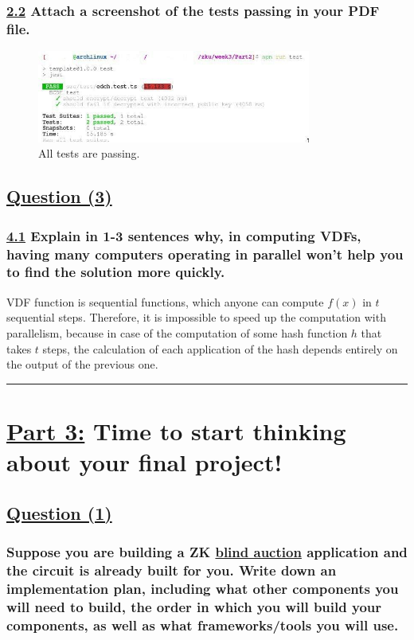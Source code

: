 \documentclass[letterpaper, 10 pt, conference]{ieeeconf}  %
\begin{document}
\subsubsection{\textbf{\underline{2.2} Attach a screenshot of the tests passing in your PDF file.}}

\begin{figure}[htp]
    \centering
    \includegraphics[width=9cm]{assets/photo_2022-07-25_23-23-16}
    \caption{All tests are passing.}
    \label{fig:galaxy}
\end{figure}

\subsection{\textbf{\underline{Question (3)}}}
\subsubsection{\textbf{\underline{4.1} Explain in 1-3 sentences why, in computing VDFs, having many computers operating in parallel won't help you to find the solution more quickly.}}

VDF function is sequential functions, which anyone can compute $f(x)$ in $t$ sequential steps. Therefore, it is impossible to speed up the computation with parallelism, because in case of the computation of some hash function $h$ that takes $t$ steps, the calculation of each application of the hash depends entirely on the output of the previous one. \cite{c2}

\noindent\rule{8cm}{0.4pt}

\section{\textbf{\underline{Part 3:}} Time to start thinking about your final project!}

\subsection{\textbf{}\underline{Question (1)}}
\subsubsection{\textbf{Suppose you are building a ZK \href{https://en.wikipedia.org/wiki/First-price_sealed-bid_auction}{blind auction} application and the circuit is already built for you. Write down an implementation plan, including what other components you will need to build, the order in which you will build your components, as well as what frameworks/tools you will use.}}
\end{document}
